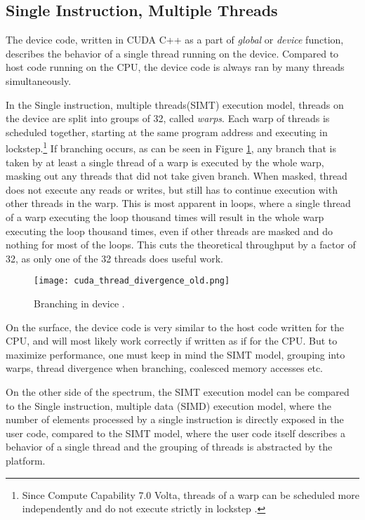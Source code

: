 \subsection{Single Instruction, Multiple Threads}
\label{sec:simt}

The device code, written in CUDA C++ as a part of \textit{global} or \textit{device} function, describes the behavior of a single thread running on the device. Compared to host code running on the CPU, the device code is always ran by many threads simultaneously.



In the Single instruction, multiple threads(SIMT) execution model, threads on the device are split into groups of 32, called \textit{warps}. Each warp of threads is scheduled together, starting at the same program address and executing in lockstep.\footnote{Since Compute Capability 7.0 Volta, threads of a warp can be scheduled more independently and do not execute strictly in lockstep \citep{paper:volta}.}
If branching occurs, as can be seen in Figure \ref{fig:thread_divergence_old}, any branch that is taken by at least a single thread of a warp is executed by the whole warp, masking out any threads that did not take given branch. When masked, thread does not execute any reads or writes, but still has to continue execution with other threads in the warp. This is most apparent in loops, where a single thread of a warp executing the loop thousand times will result in the whole warp executing the loop thousand times, even if other threads are masked and do nothing for most of the loops. This cuts the theoretical throughput by a factor of 32, as only one of the 32 threads does useful work.

\begin{figure}[h]
	\centering
	\texttt{[image: cuda\_thread\_divergence\_old.png]}
	\caption{Branching in device \citep{site:cuda}.}
	\label{fig:thread_divergence_old}
\end{figure}


On the surface, the device code is very similar to the host code written for the CPU, and will most likely work correctly if written as if for the CPU. But to maximize performance, one must keep in mind the SIMT model, grouping into warps, thread divergence when branching, coalesced memory accesses etc.

On the other side of the spectrum, the SIMT execution model can be compared to the Single instruction, multiple data (SIMD) execution model, where the number of elements processed by a single instruction is directly exposed in the user code, compared to the SIMT model, where the user code itself describes a behavior of a single thread and the grouping of threads is abstracted by the platform. 


